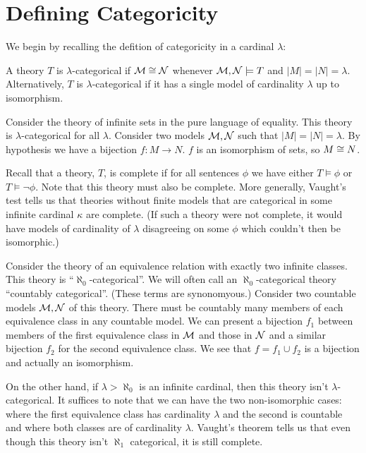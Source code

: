 \section{Defining Categoricity}

We begin by recalling the defition of categoricity in a cardinal \(\lambda\):

\begin{definition}\label{def_categoricity}
A theory \(T\) is \(\lambda\)-categorical if \(\mathcal{M} \cong \mathcal{N}\) whenever \(\mathcal{M}, \mathcal{N} \models T\) and \(|M| = |N| = \lambda\).
Alternatively, \(T\) is \(\lambda\)-categorical if it has a single model of cardinality \(\lambda\) up to isomorphism. 
\end{definition}

\begin{example}\label{example_categoricity_sets}
Consider the theory of infinite sets in the pure language of equality. 
This theory is \(\lambda\)-categorical for all \(\lambda\).
Consider two models \(\mathcal{M}, \mathcal{N}\) such that \(|M|=|N|=\lambda\). 
By hypothesis we have a bijection \(f: M \to N\). 
\(f\) is an isomorphism of sets, so \(M \cong N\).
\end{example}

Recall that a theory, \(T\), is complete if for all sentences \(\phi\) we have either \(T \models \phi\) or \(T \models \neg \phi\). 
Note that this theory must also be complete. 
More generally, Vaught's test tells us that theories without finite models that are categorical in some infinite cardinal \(\kappa\) are complete. 
(If such a theory were not complete, it would have models of cardinality of \(\lambda\) disagreeing on some \(\phi\) which couldn't then be isomorphic.)

\begin{example}\label{example_categoricity_equiv}
Consider the theory of an equivalence relation with exactly two infinite classes. 
This theory is ``\(\aleph_0\)-categorical''.
We will often call an \(\aleph_0\)-categorical theory ``countably categorical''.
(These terms are synonomyous.)  
Consider two countable models \(\mathcal{M}, \mathcal{N}\) of this theory. 
There must be countably many members of each equivalence class in any countable model. 
We can present a bijection \(f_1\) between members of the first equivalence class in  \(\mathcal{M}\) and those in \(\mathcal{N}\) and a similar bijection \(f_2\) for the second equivalence class. 
We see that \(f = f_1 \cup f_2\) is a bijection and actually an isomorphism. 

On the other hand, if \(\lambda > \aleph_0\) is an infinite cardinal, then this theory isn't \(\lambda\)-categorical. 
It suffices to note that we can have the two non-isomorphic cases: where the first equivalence class has cardinality \(\lambda\) and the second is countable and where both classes are of cardinality \(\lambda\). 
Vaught's theorem tells us that even though this theory isn't \(\aleph_1\) categorical, it is still complete. 
\end{example}

